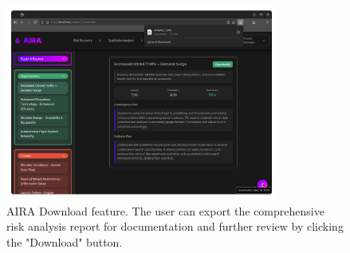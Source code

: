 \begin{figure}[H]
    \centering
    \includegraphics[width=0.8\textwidth]{figures/screenshots/download.png}
    \caption{AIRA Download feature. The user can export
    the comprehensive risk analysis report for
    documentation and further review by clicking
    the "Download" button.}
    \label{fig:download}
\end{figure}